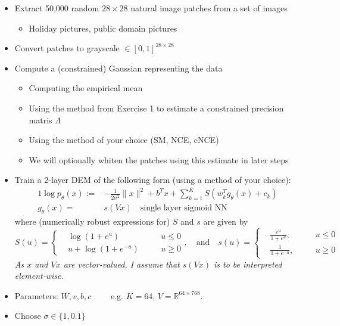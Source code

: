 \documentclass[a4paper]{article}
\begin{document}
\begin{itemize}
\item Extract 50,000 random $28\times 28$ natural image patches from a set of images
\begin{itemize}
\item Holiday pictures, public domain pictures
\end{itemize}

\item Convert patches to grayscale $\in [0,1]^{28\times28}$

\item Compute a (constrained) Gaussian representing the data
\begin{itemize}
\item Computing the empirical mean
\item Using the method from Exercise 1 to estimate a constrained precision matris $\Lambda$
\item Using the method of your choice (SM, NCE, cNCE)
\item We will optionally whiten the patches using this estimate in later steps
\end{itemize}

\item Train a 2-layer DEM of the following form (using a method of your choice):
\begin{alignat*}{1}
\log p_\theta(x) := &-\frac{1}{2\sigma^2} \|x\|^2 + b^T x + \sum_{k=1}^K S\left(w_k^T g_\theta(x) + c_k\right)\\
g_\theta(x) = \ &s(Vx) \quad \text{single layer sigmoid NN}
\end{alignat*}
where (numerically robust expressions for) $S$ and $s$ are given by
$$S(u) = \left\{ \begin{aligned} &\log(1 + e^u) \quad &&u \leq 0\\ &u + \log(1 + e^{-u}) \quad &&u \geq 0\end{aligned}\right. , \quad \text{and} \quad s(u) = \left\{ \begin{aligned} &\frac{e^u}{1 + e^u} , \quad &&u \leq 0\\ &\frac{1}{1 + e^{-u}}, \quad &&u \geq 0\end{aligned}\right.$$
\textit{As $x$ and $Vx$ are vector-valued, I assume that $s(Vx)$ is to be interpreted element-wise.}

\item Parameters: $W, v, b, c \qquad$ e.g. $K = 64$, $V = \mathbb{R}^{64 \times 768}$.

\item Choose $\sigma \in \{1,0.1\}$


\end{itemize}
\end{document}
